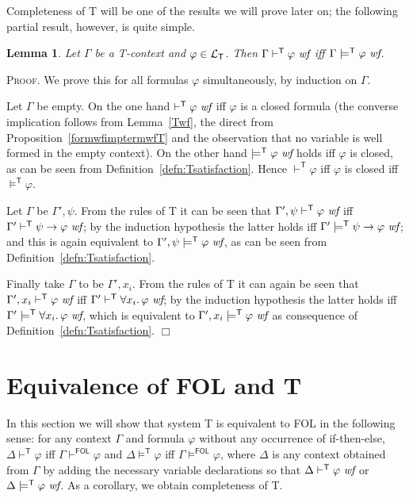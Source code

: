 \documentclass{article}
\newtheorem{lemma}[definition]{Lemma}
\newenvironment{proof}{\smallskip\textsc{Proof.}}{\hspace*{\fill}$\Box$}
\newcommand{\T}{\textsf T}
\newcommand{\FOL}{\textsf{FOL}}
\newcommand{\ifte}{\textsf{if-then-else}}
\newcommand{\wf}{\ \mbox{\em wf}}
\newcommand{\lang}[1]{\ensuremath{{\cal L}_{\mathsf{#1}}}}
\newcommand{\myvdash}[1]{\ensuremath{\vdash^{\mathsf{#1}}}}
\newcommand{\yields}[1]{\ensuremath{\models^{\mathsf{#1}}}}
\def\sep{.\,}
\begin{document}
Completeness of {\T} will be one of the results we will prove later on;
the following partial result, however, is quite simple.
\begin{lemma}\label{Twfsyntsem} Let $\Gamma$ be a {\T}-context and
$\varphi\in\lang{T}$.  Then $\Gamma\myvdash{T}\varphi\wf$ iff
$\Gamma\yields{T}\varphi\wf$.
\end{lemma}
\begin{proof}
We prove this for all formulas $\varphi$ simultaneously, by induction
on $\Gamma$.

Let $\Gamma$ be empty.  On the one hand
$\myvdash{T}\varphi\wf$ iff $\varphi$ is a closed formula (the converse
implication follows from Lemma~\ref{Twf}, the direct from
Proposition~\ref{formwfimptermwfT} and the observation that no variable is
well formed in the empty context).
On the other hand $\yields{T}\varphi\wf$ holds iff
$\varphi$ is closed, as can be seen from
Definition~\ref{defn:Tsatisfaction}.
Hence $\myvdash{T}\varphi$ iff $\varphi$ is closed iff $\yields{T}\varphi$.

Let $\Gamma$ be $\Gamma',\psi$.  From the rules of {\T} it can be seen
that $\Gamma',\psi\myvdash{T}\varphi\wf$ iff
$\Gamma'\myvdash{T}\psi\to\varphi\wf$; by the induction hypothesis the
latter holds iff $\Gamma'\yields{T}\psi\to\varphi\wf$; and this is again
equivalent to $\Gamma',\psi\yields{T}\varphi\wf$, as can be seen from
Definition~\ref{defn:Tsatisfaction}.

Finally take $\Gamma$ to be $\Gamma',x_i$.  From the rules of {\T} it can
again be seen that $\Gamma',x_i\myvdash{T}\varphi\wf$ iff
$\Gamma'\myvdash{T}\forall x_i\sep\varphi\wf$; by the induction hypothesis
the latter holds iff $\Gamma'\yields{T}\forall x_i\sep\varphi\wf$, which is
equivalent to $\Gamma',x_i\yields{T}\varphi\wf$ as consequence of
Definition~\ref{defn:Tsatisfaction}.
\end{proof}

\section{Equivalence of {\FOL} and {\T}}

In this section we will show that system {\T} is equivalent to
{\FOL} in the following sense: for any context $\Gamma$ and
formula $\varphi$ without any occurrence of {\ifte},
$\Delta\myvdash{T}\varphi$ iff $\Gamma\myvdash{FOL}\varphi$
and $\Delta\yields{T}\varphi$ iff $\Gamma\yields{FOL}\varphi$,
where $\Delta$ is any context obtained from $\Gamma$ by adding
the necessary variable declarations so that $\Delta\myvdash{T}\varphi\wf$
or $\Delta\yields{T}\varphi\wf$.
As a corollary, we obtain completeness of {\T}.
\end{document}
